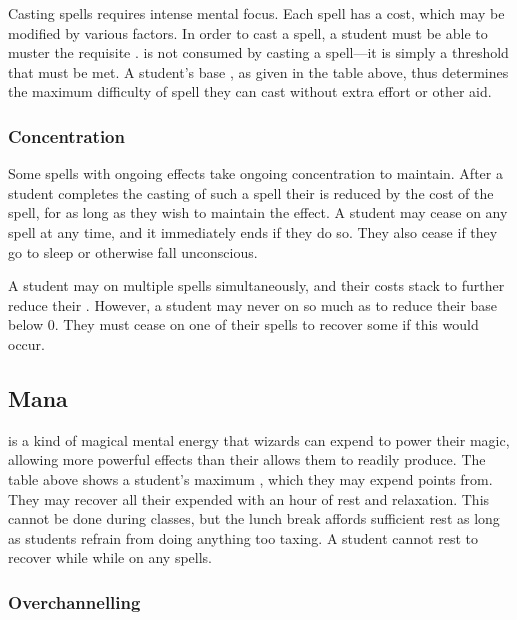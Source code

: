 Casting spells requires intense mental focus.
Each spell has a {\focus} cost, which may be modified by various factors.
In order to cast a spell, a student must be able to muster the requisite {\focus}.
\capital{\focus} is not consumed by casting a spell---it is simply a threshold that must be met.
A student's base {\focus}, as given in the table above, thus determines the maximum difficulty of spell they can cast without extra effort or other aid.

\subsubsection{Concentration}

Some spells with ongoing effects take ongoing concentration to maintain.
After a student completes the casting of such a spell their {\focus} is reduced by the {\concentration} cost of the spell, for as long as they wish to maintain the effect.
A student may cease {\concentrating} on any spell at any time, and it immediately ends if they do so.
They also cease {\concentrating} if they go to sleep or otherwise fall unconscious.

A student may {\concentrate} on multiple spells simultaneously, and their {\concentration} costs stack to further reduce their {\focus}.
However, a student may never {\concentrate} on so much as to reduce their base {\focus} below 0.
They must cease {\concentrating} on one of their spells to recover some {\focus} if this would occur.

\subsection{Mana}

\capital{\mana} is a kind of magical mental energy that wizards can expend to power their magic, allowing more powerful effects than their {\focus} allows them to readily produce.
The table above shows a student's maximum {\mana}, which they may expend points from.
They may recover all their expended {\mana} with an hour of rest and relaxation.
This cannot be done during classes, but the lunch break affords sufficient rest as long as students refrain from doing anything too taxing.
A student cannot rest to recover while {\mana} while {\concentrating} on any spells.

\subsubsection{Overchannelling}

